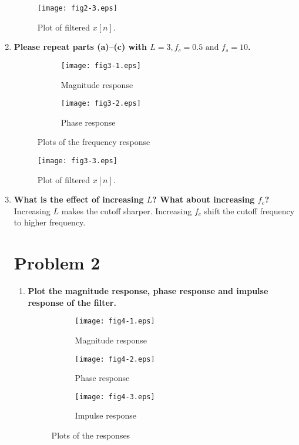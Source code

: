 \documentclass[12pt, a4paper]{article}
\begin{document}
\begin{enumerate}[label=(\alph*)]
    \begin{figure}[H]
      \centering
      \texttt{[image: fig2-3.eps]}
      \caption{Plot of filtered $x[n]$.}
    \end{figure}

  \item {\bf Please repeat parts (a)--(c) with $L = 3, f_c = 0.5 \text{ and } f_s = 10$.} \\[12pt]
    \begin{figure}[H]
      \centering
      \begin{subfigure}{0.49\textwidth}
        \texttt{[image: fig3-1.eps]}
        \caption{Magnitude response}
      \end{subfigure}%
      \begin{subfigure}{0.49\textwidth}
        \texttt{[image: fig3-2.eps]}
        \caption{Phase response}
      \end{subfigure}
      \caption{Plots of the frequency response}
    \end{figure}

    \begin{figure}[H]
      \centering
      \texttt{[image: fig3-3.eps]}
      \caption{Plot of filtered $x[n]$.}
    \end{figure}

  \item {\bf What is the effect of increasing $L$? What about increasing $f_c$?}\\[12pt]
    Increasing $L$ makes the cutoff sharper.
    Increasing $f_c$ shift the cutoff frequency to higher frequency.

\section{Problem 2}
\begin{enumerate}[label=(\alph*)]
  \addtocounter{enumi}
  \item {\bf Plot the magnitude response, phase response and impulse response of the filter.}    \\[12pt]
  \begin{center}
    \begin{figure}[H]
      \centering
      \begin{subfigure}{0.49\textwidth}
        \texttt{[image: fig4-1.eps]}
        \caption{Magnitude response}
      \end{subfigure}%
      \begin{subfigure}{0.49\textwidth}
        \texttt{[image: fig4-2.eps]}
        \caption{Phase response}
      \end{subfigure}
      \begin{subfigure}{0.49\textwidth}
        \texttt{[image: fig4-3.eps]}
        \caption{Impulse response}
      \end{subfigure}
      \caption{Plots of the responses}
    \end{figure}
  \end{center}


\end{enumerate}
\end{enumerate}
\end{document}
